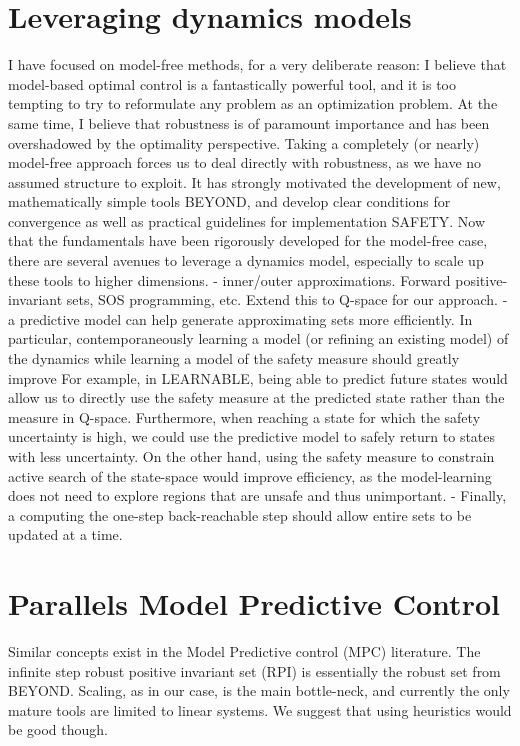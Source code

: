 \section{Leveraging dynamics models} \label{chap:discussion}
I have focused on model-free methods, for a very deliberate reason: I believe that model-based optimal control is a fantastically powerful tool, and it is too tempting to try to reformulate any problem as an optimization problem.
At the same time, I believe that robustness is of paramount importance and has been overshadowed by the optimality perspective.
Taking a completely (or nearly) model-free approach forces us to deal directly with robustness, as we have no assumed structure to exploit.
It has strongly motivated the development of new, mathematically simple tools BEYOND, and develop clear conditions for convergence as well as practical guidelines for implementation SAFETY. 
Now that the fundamentals have been rigorously developed for the model-free case, there are several avenues to leverage a dynamics model, especially to scale up these tools to higher dimensions.
- inner/outer approximations. Forward positive-invariant sets, SOS programming, etc. Extend this to Q-space for our approach.
- a predictive model can help generate approximating sets more efficiently. In particular, contemporaneously learning a model (or refining an existing model) of the dynamics while learning a model of the safety measure should greatly improve  For example, in LEARNABLE, being able to predict future states would allow us to directly use the safety measure at the predicted state rather than the measure in Q-space. Furthermore, when reaching a state for which the safety uncertainty is high, we could use the predictive model to safely return to states with less uncertainty. On the other hand, using the safety measure to constrain active search of the state-space would improve efficiency, as the model-learning does not need to explore regions that are unsafe and thus unimportant.
- Finally, a computing the one-step back-reachable step should allow entire sets to be updated at a time.

\section{Parallels Model Predictive Control}
Similar concepts exist in the Model Predictive control (MPC) literature. The infinite step robust positive invariant set (RPI) is essentially the robust set from BEYOND. Scaling, as in our case, is the main bottle-neck, and currently the only mature tools are limited to linear systems.
We suggest that using heuristics would be good though.